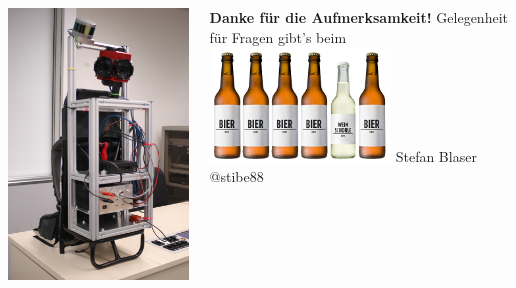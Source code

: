 \documentclass[aspectratio=169]{beamer}
\begin{document}
\begin{frame}
   \begin{columns}[onlytextwidth]
    \begin{column}{0.33\textwidth}
      \includegraphics[height=0.7\textheight]{./Abbildungen/cappro_3.JPG}
    \end{column}
    \begin{column}{0.66\textwidth}
      \textbf{Danke für die Aufmerksamkeit!} \newline
      Gelegenheit für Fragen gibt's beim \newline
      \includegraphics[width=0.6\textwidth]{./Abbildungen/beer.JPG} \newline
      Stefan Blaser\newline
      @stibe88
    \end{column}
  \end{columns}
\end{frame}
\end{document}

